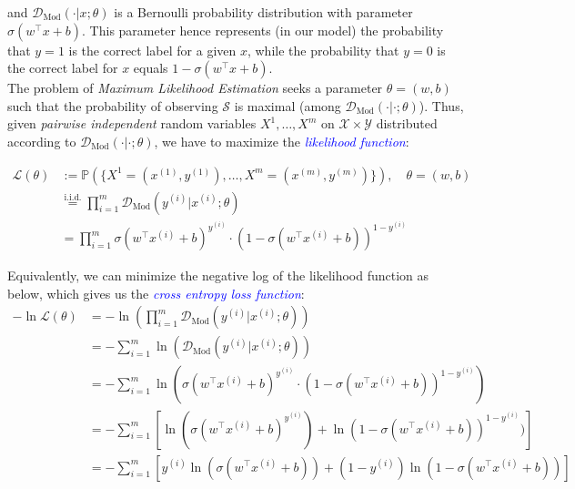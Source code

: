 and $\mathcal{D}_{\text{Mod}}(\cdot|x;\theta)$ is a Bernoulli probability distribution with parameter $\sigma(w^\top x + b)$. This parameter hence represents (in our model) the probability that $y=1$ is the correct label for a given $x$, while the probability that $y=0$ is the correct label for $x$ equals $1 - \sigma(w^\top x + b)$.\\

The problem of \emph{Maximum Likelihood Estimation} seeks a parameter $\theta=(w,b)$ such that the probability of observing $\mathcal{S}$ is maximal (among $\mathcal{D}_{\text{Mod}}(\cdot|\cdot;\theta)$). Thus, given \emph{pairwise independent} random variables $X^1, \dots, X^m$ on $\mathcal{X} \times \mathcal{Y}$ distributed according to $\mathcal{D}_{\text{Mod}}(\cdot|\cdot;\theta)$, we have to maximize the \textcolor{blue}{\emph{likelihood function}}:

\begin{equation}
    \begin{aligned}
    \mathcal{L}(\theta) &:= \mathbb{P}(\{X^1 = (x^{(1)}, y^{(1)}), \dots, X^m = (x^{(m)}, y^{(m)})\}), \quad \theta=(w,b)\\
    & \overset{\text{i.i.d.}}{=} \prod_{i=1}^{m}\mathcal{D}_{\text{Mod}}(y^{(i)}|x^{(i)};\theta)\\
    & = \prod_{i=1}^{m}\sigma(w^\top x^{(i)} + b)^{y^{(i)}} \cdot (1 - \sigma(w^\top x^{(i)} + b))^{1 - y^{(i)}}
    \end{aligned}
    \label{eqn:4}
\end{equation}

Equivalently, we can minimize the negative log of the likelihood function as below, which gives us the \textcolor{blue}{\emph{cross entropy loss function}}:
\begin{equation}
    \begin{aligned}
    -\ln \mathcal{L}(\theta) &= -\ln(\prod_{i=1}^{m}\mathcal{D}_{\text{Mod}}(y^{(i)}|x^{(i)};\theta))\\
    &= -\sum_{i=1}^{m}\ln(\mathcal{D}_{\text{Mod}}(y^{(i)}|x^{(i)};\theta))\\
    &= -\sum_{i=1}^{m}\ln(\sigma(w^\top x^{(i)} + b)^{y^{(i)}} \cdot (1 - \sigma(w^\top x^{(i)} + b))^{1 - y^{(i)}})\\
    &= -\sum_{i=1}^{m}[\ln(\sigma(w^\top x^{(i)} + b)^{y^{(i)}})+ \ln(1 - \sigma(w^\top x^{(i)} + b))^{1 - y^{(i)}})]\\
    &= -\sum_{i=1}^{m}[y^{(i)}\ln(\sigma(w^\top x^{(i)} + b))+(1-y^{(i)})\ln(1 - \sigma(w^\top x^{(i)} + b))]
    \end{aligned}
    \label{eqn:5}
\end{equation}


